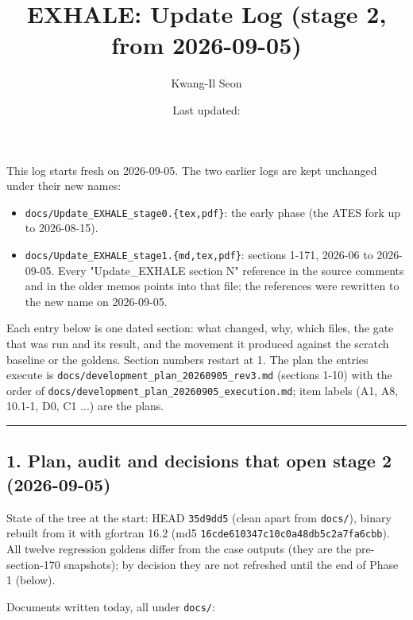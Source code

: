 \documentclass[english,a4paper]{my_memo}
\providecommand{\tightlist}{\setlength{\itemsep}{0pt}\setlength{\parskip}{0pt}}
\begin{document}
\title{EXHALE: Update Log (stage 2, from 2026-09-05)}
\author{Kwang-Il Seon}
\date{Last updated: \docmoddate}
\maketitle

\tableofcontents
\bigskip

This log starts fresh on 2026-09-05. The two earlier logs are kept unchanged
under their new names:

\begin{itemize}
\tightlist
\item
  \texttt{docs/Update\_EXHALE\_stage0.\{tex,pdf\}}: the early phase (the ATES fork up to
  2026-08-15).
\item
  \texttt{docs/Update\_EXHALE\_stage1.\{md,tex,pdf\}}: sections 1-171, 2026-06 to
  2026-09-05. Every "Update\_EXHALE section N" reference in the source
  comments and in the older memos points into that file; the references were
  rewritten to the new name on 2026-09-05.
\end{itemize}

Each entry below is one dated section: what changed, why, which files, the
gate that was run and its result, and the movement it produced against the
scratch baseline or the goldens. Section numbers restart at 1. The plan the
entries execute is \texttt{docs/development\_plan\_20260905\_rev3.md} (sections 1-10)
with the order of \texttt{docs/development\_plan\_20260905\_execution.md}; item labels
(A1, A8, 10.1-1, D0, C1 ...) are the plan\textquotesingle s.

\begin{center}\rule{0.5\linewidth}{0.5pt}\end{center}

\subsection{1. Plan, audit and decisions that open stage 2 (2026-09-05)}\label{1-plan-audit-and-decisions-that-open-stage-2-2026-09-05}

State of the tree at the start: HEAD \texttt{35d9dd5} (clean apart from \texttt{docs/}),
binary rebuilt from it with gfortran 16.2 (md5 \texttt{16cde610347c10c0a48db5c2a7fa6cbb}).
All twelve regression goldens differ from the case outputs (they are the
pre-section-170 snapshots); by decision they are not refreshed until the end
of Phase 1 (below).

Documents written today, all under \texttt{docs/}:
\end{document}

